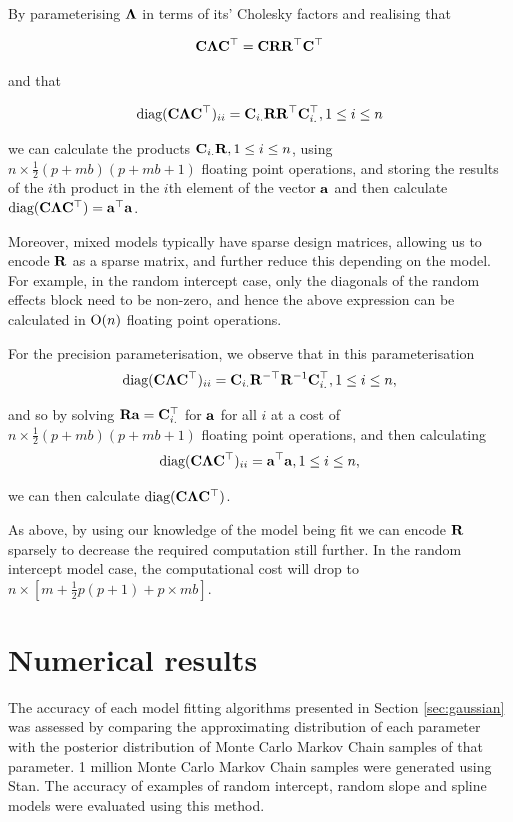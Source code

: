 	By parameterising ${\boldsymbol \Lambda}$ in terms of its' Cholesky factors and realising that
		
	\[
		{\bf C} {\boldsymbol \Lambda} {\bf C}^\top = {\bf C} {\bf R} {\bf R}^\top {\bf C}^\top
	\]
		
	\noindent and that
		
	\[
		\text{diag}({\bf C} {\boldsymbol \Lambda} {\bf C}^\top)_{ii} = {\bf C}_{i .} {\bf R} {\bf R}^\top {\bf C}_{i .}^\top, 1 \leq i \leq n
	\]
		
	\noindent we can calculate the products ${\bf C}_{i .} {\bf R}, 1 \leq i \leq n$, using $n \times \frac{1}{2}(p + m
	b)(p + m b   + 1)$ floating point operations, and storing the results of the $i$th product in the $i$th
	element of the   vector ${\bf a}$ and then calculate $\text{diag}({\bf C} {\boldsymbol \Lambda} {\bf C}^\top) = {\bf a}^\top {\bf a}$.
		
	Moreover, mixed models typically have sparse design matrices, allowing us to encode ${\bf R}$ as a sparse matrix, and	further reduce   this depending on the model. For example, in the random intercept case, only the diagonals of the random effects block need to be non-zero, and hence the above expression can be calculated in
	$\text{O}(n)$ floating point operations.
		
		
	For the precision parameterisation, we observe that in this parameterisation
	\[
		\text{diag}({\bf C} {\boldsymbol \Lambda} {\bf C}^\top)_{ii} = {\bf C}_{i .} {\bf R}^{-\top} {\bf R}^{-1} {\bf C}_{i .}^\top, 1 \leq i \leq n,
	\]
		
	\noindent and so by solving ${\bf R} {\bf a} = {\bf C}_{i .}^\top$ for ${\bf a}$ for all $i$ at a cost of $n \times
	\frac{1}{2} (p + m b) (p + m b + 1)$ floating point operations, and then calculating
	\[
		\text{diag}({\bf C} {\boldsymbol \Lambda} {\bf C}^\top)_{ii} = {\bf a}^\top {\bf a}, 1 \leq i \leq n,
	\]
		
	\noindent we can then calculate $\text{diag}({\bf C} {\boldsymbol \Lambda} {\bf C}^\top)$.
		
	As above, by using our knowledge of the model being fit we can encode ${\bf R}$ sparsely to decrease
	the required   computation still further. In the random intercept model case, the computational cost will drop
	to   $n \times [m + \frac{1}{2} p (p + 1) + p \times m b]$.
				
			\section{Numerical results}
			\label{sec:results}
					
			The accuracy of each model fitting algorithms presented in Section \ref{sec:gaussian} was assessed by
			comparing the approximating distribution of each parameter with the posterior distribution of Monte Carlo
			Markov Chain samples of that parameter. 1 million Monte Carlo Markov Chain samples were generated using Stan.
			The accuracy of examples of random intercept, random slope and spline models were evaluated using this method.
					
